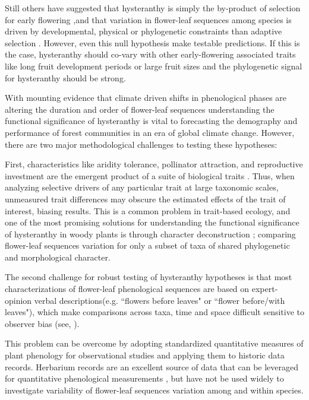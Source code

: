 \documentclass{article}\usepackage[]{graphicx}\usepackage[]{color}
\begin{document}
\noindent Still others have suggested that hysteranthy is simply the by-product of selection for early flowering \citep{},and that variation in flower-leaf sequences among species is driven by developmental, physical or phylogenetic constraints than adaptive selection \citep{}. However, even this null hypothesis make testable predictions. If this is the case, hysteranthy should co-vary with other early-flowering associated traits like long fruit development periods or large fruit sizes \citep{} and the phylogenetic signal for hysteranthy should be strong.

\noindent With mounting evidence that climate driven shifts in phenological phases are altering the duration and order of flower-leaf sequences \citep{} understanding the functional significance of hysteranthy is vital to forecasting the demography and performance of forest communities in an era of global climate change. However, there are two major methodological challenges to testing these hypotheses:

\noindent First, characteristics like aridity tolerance, pollinator attraction, and reproductive investment are the emergent product of a suite of biological traits \citep{}. Thus, when analyzing selective drivers of any particular trait at large taxonomic scales, unmeasured trait differences may obscure the estimated effects of the trait of interest, biasing results. %
This is a common problem in trait-based ecology, and one of the most promising solutions for understanding the functional significance of hysteranthy in woody plants is through character deconstruction \citep{}; comparing flower-leaf sequences variation for only a subset of taxa of shared phylogenetic and morphological character.   

\noindent The second challenge for robust testing of hysteranthy hypotheses is that most characterizations of flower-leaf phenological sequences are based on expert-opinion verbal descriptions(e.g. ``flowers before leaves" or ``flower before/with leaves"), which make comparisons across taxa, time and space difficult sensitive to observer bias (see, \citep{}). 

\noindent This problem can be overcome by adopting standardized quantitative measures of plant phenology for observational studies and applying them to historic data records. Herbarium records are an excellent source of data that can be leveraged for quantitative phenological measurements \citep{}, but have not be used widely to investigate variability of flower-leaf sequences variation among and within species.
\end{document}
